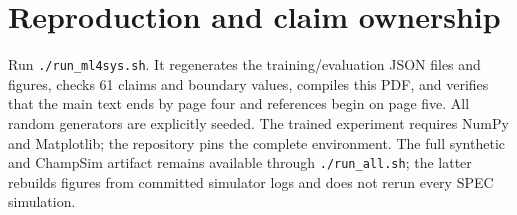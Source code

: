\documentclass{article}
\begin{document}
\section{Reproduction and claim ownership}

Run \texttt{./run\_ml4sys.sh}.  It regenerates the training/evaluation JSON files
and figures, checks 61 claims and boundary values, compiles this PDF, and verifies
that the main text ends by page four and references begin on page five.  All random generators
are explicitly seeded.  The trained experiment requires NumPy and Matplotlib;
the repository pins the complete environment.  The full synthetic and ChampSim
artifact remains available through \texttt{./run\_all.sh}; the latter rebuilds
figures from committed simulator logs and does not rerun every SPEC simulation.
\end{document}
